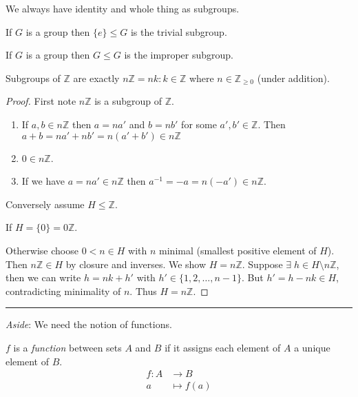 We always have identity and whole thing as subgroups.

\begin{example}
If \(G\) is a group then \(\{ e \} \leq G\) is the trivial subgroup.
\end{example}

\begin{example}
If \(G\) is a group then \(G \leq G\) is the improper subgroup.
\end{example}

\begin{proposition}
\protect\hypertarget{prp:nZ}{}\label{prp:nZ}Subgroups of \(\mathbb{Z}\) are exactly \(n \mathbb{Z} = {nk : k \in \mathbb{Z}}\) where \(n \in \mathbb{Z}_{\geq 0}\) (under addition).
\end{proposition}

\begin{proof}
First note \(n \mathbb{Z}\) is a subgroup of \(\mathbb{Z}\).

\begin{enumerate}
\def\labelenumi{\alph{enumi}.}
\item
  If \(a, b \in n \mathbb{Z}\) then \(a = na'\) and \(b = nb'\) for some \(a', b' \in \mathbb{Z}\).
  Then \(a + b = na' + nb' = n (a' + b') \in n \mathbb{Z}\)
\item
  \(0 \in n \mathbb{Z}\).
\item
  If we have \(a = na' \in n \mathbb{Z}\) then \(a^{-1} = -a = n(-a') \in n \mathbb{Z}\).
\end{enumerate}

Conversely assume \(H \leq \mathbb{Z}\).

If \(H = \{ 0 \} = 0 \mathbb{Z}\).

Otherwise choose \(0 < n \in H\) with \(n\) minimal (smallest positive element of \(H\)).
Then \(n \mathbb{Z} \in H\) by closure and inverses. We show \(H = n \mathbb{Z}\). Suppose \(\exists \; h \in H \setminus n \mathbb{Z}\), then we can write \(h = nk + h'\) with \(h' \in \{ 1, 2, \ldots, n -1 \}\). But \(h' = h - nk \in H\), contradicting minimality of \(n\). Thus \(H = n \mathbb{Z}\).
\end{proof}

\begin{center}\rule{\linewidth}{0.5pt}\end{center}

\emph{Aside}: We need the notion of functions.
\begin{definition}[Function]
  \(f\) is a \emph{function} between sets \(A\) and \(B\) if it assigns each element of \(A\) a unique element of \(B\).
\begin{align*}
    f: A &\to B \\
    a &\mapsto f(a)
\end{align*}
\end{definition} 

